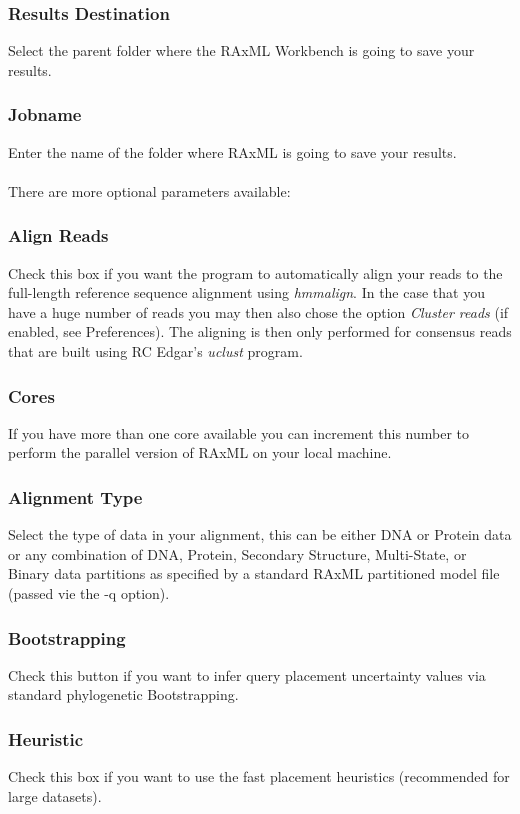 \documentclass{article}
\begin{document}
	\subsubsection*{Results Destination}
	Select the parent folder where the RAxML Workbench is going to save your results.
	\subsubsection*{Jobname}
	Enter the name of the folder where RAxML is going to save your results. \\\\
	There are more optional parameters available:
	\subsubsection*{Align Reads}
	Check this box if you want the program to automatically align your reads to the full-length reference sequence alignment using \textit{hmmalign}. In the case that you have a huge number of reads you may then also chose the option \textit{Cluster reads} (if enabled, see Preferences). The aligning is then only performed for consensus reads that are built using RC Edgar's \textit{uclust} program.   
	\subsubsection*{Cores}
	If you have more than one core available you can increment this number to perform the parallel version of RAxML on your local machine.
	\subsubsection*{Alignment Type}
	 Select the type of data in your alignment, this can be either DNA or Protein data or any combination of DNA, Protein, Secondary Structure, Multi-State, or Binary data partitions as specified by a standard RAxML partitioned model file (passed vie the -q option).
	 \subsubsection*{Bootstrapping}
	 Check this button if you want to infer query placement uncertainty values via standard phylogenetic Bootstrapping.
	 \subsubsection*{Heuristic}
	  Check this box if you want to use the fast placement heuristics (recommended for large datasets).
		
\end{document}
